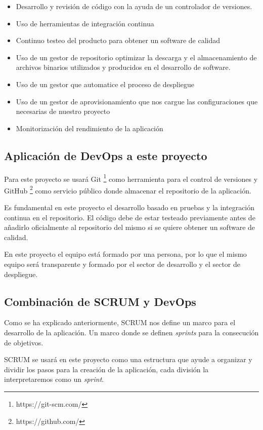 \begin{itemize}
    \item Desarrollo y revisión de código con la ayuda de un controlador de versiones.
    \item Uso de herramientas de integración continua
    \item Continuo testeo del producto para obtener un software de calidad
    \item Uso de un gestor de repositorio optimizar la descarga y el almacenamiento de archivos binarios utilizados y producidos en el desarrollo de software.
    \item Uso de un gestor que automatice el proceso de despliegue
    \item Uso de un gestor de aprovisionamiento que nos cargue las configuraciones que necesarias de nuestro proyecto
    \item Monitorización del rendimiento de la aplicación
\end{itemize}

\subsection{Aplicación de DevOps a este proyecto}

Para este proyecto se usará Git \footnote{https://git-scm.com/} como herramienta para el control de versiones y GitHub \footnote{https://github.com/} como servicio público donde almacenar el repositorio de la aplicación.

Es fundamental en este proyecto el desarrollo basado en pruebas y la integración continua en el repositorio. El código debe de estar testeado previamente antes de añadirlo oficialmente al repositorio del mismo si se quiere obtener un software de calidad.

En este proyecto el equipo está formado por una persona, por lo que el mismo equipo será transparente y formado por el sector de desarrollo y el sector de despliegue.


\subsection{Combinación de SCRUM y DevOps}

Como se ha explicado anteriormente, SCRUM nos define un marco para el desarrollo de la aplicación. Un marco donde se definen \textit{sprints} para la consecución de objetivos.

SCRUM se usará en este proyecto como una estructura que ayude a organizar y dividir los pasos para la creación de la aplicación, cada división la interpretaremos como un \textit{sprint}.

